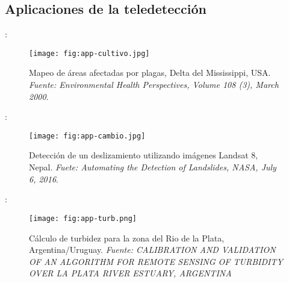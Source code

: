 
\subsection{Aplicaciones de la teledetección}

\begin{frame}{\secname : \subsecname}
  \begin{figure}
    \centering
    \texttt{[image: fig:app-cultivo.jpg]}
    \caption{Mapeo de áreas afectadas por plagas, Delta del Mississippi, USA. \emph{Fuente: Environmental Health Perspectives, Volume 108 (3), March 2000}.}
    \label{}
  \end{figure}
\end{frame}

\begin{frame}{\secname : \subsecname}
  \begin{figure}
    \centering
    \texttt{[image: fig:app-cambio.jpg]}
    \caption{Detección de un deslizamiento utilizando imágenes Landsat 8, Nepal. \emph{Fuete: Automating the Detection of Landslides, NASA, July 6, 2016}.}
    \label{}
  \end{figure}
\end{frame}

\begin{frame}{\secname : \subsecname}
  \begin{figure}
    \centering
    \texttt{[image: fig:app-turb.png]}
    \caption{Cálculo de turbidez para la zona del Rio de la Plata, Argentina/Uruguay. \emph{Fuente: CALIBRATION AND VALIDATION OF AN ALGORITHM FOR REMOTE SENSING OF TURBIDITY OVER LA PLATA RIVER ESTUARY, ARGENTINA}}
    \label{}
  \end{figure}
\end{frame}

